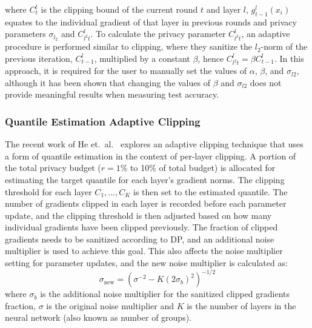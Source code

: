where $C_t^l$ is the clipping bound of the current round $t$ and layer $l$, $g_{t-1}^l(x_i)$  equates to the individual gradient of that layer in previous rounds and privacy parameters $\sigma_{l_2}$ and ${C_{l^2t}^l}$. To calculate the privacy parameter ${C_{l^2t}^l}$, an adaptive procedure is performed similar to clipping, where they sanitize the $l_2$-norm of the previous iteration, $C_{t-1}^l$, multiplied by a constant $\beta$, hence ${C_{l^2t}^l}=\beta C_{t-1}^l$. In this approach, it is required for the user to manually set the values of $\alpha$, $\beta$, and $\sigma_{l2}$, although it has been shown that changing the values of $\beta$ and $\sigma_{l2}$ does not provide meaningful results when measuring test accuracy. 

\subsubsection{Quantile Estimation Adaptive Clipping}
\label{sec:quantile}
The recent work of He et.~al.~\cite{RefWorks:RefID:39-he2022exploring} explores an adaptive clipping technique that uses a form of quantile estimation in the context of per-layer clipping. A portion of the total privacy budget ($r=1\%$ to 10\% of total budget) is allocated for estimating the target quantile for each layer’s gradient norms. The clipping threshold for each layer $C_1,...,C_K$ is then set to the estimated quantile. The number of gradients clipped in each layer is recorded before each parameter update, and the clipping threshold is then adjusted based on how many individual gradients have been clipped previously. The fraction of clipped gradients needs to be sanitized according to DP, and an additional noise multiplier is used to achieve this goal. This also affects the noise multiplier setting for parameter updates, and the new noise multiplier is calculated as:
\[ \sigma_\text{new}=(\sigma^{-2}-K(2\sigma_b)^2)^{-1/2}\]
where $\sigma_b$ is the additional noise multiplier for the sanitized clipped gradients fraction, $\sigma$ is the original noise multiplier and $K$ is the number of layers in the neural network (also known as number of groups).

